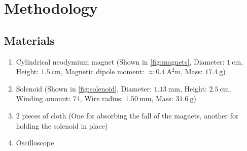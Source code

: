 \chapter{Methodology}

\section{Materials}

\begin{enumerate}
	\item Cylindrical neodymium magnet (Shown in \cref{fig:magnets}, Diameter: $\qty{1}{\centi\meter}$, Height: $\qty{1.5}{\centi\meter}$, Magnetic dipole moment: $\approx \qty{0.4}{\ampere^2\meter}$, Mass: $\qty{17.4}{\gram}$)
	\item Solenoid (Shown in \cref{fig:solenoid}, Diameter: $\qty{1.13}{\milli\meter}$, Height: $\qty{2.5}{\centi\meter}$, Winding amount: $74$, Wire radius: $\qty{1.50}{\milli\meter}$, Mass: $\qty{31.6}{\gram}$)
	\item $2$ pieces of cloth (One for absorbing the fall of the magnets, another for holding the solenoid in place)
	\item Oscilloscope
\end{enumerate}

